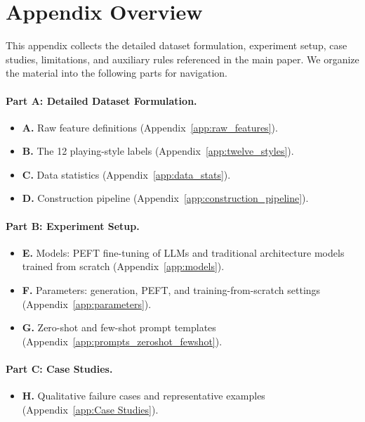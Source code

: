 
\section*{Appendix Overview}
\label{app:overview}

This appendix collects the detailed dataset formulation, experiment setup, case studies, limitations, and auxiliary rules referenced in the main paper. We organize the material into the following parts for navigation.

\paragraph{Part A: Detailed Dataset Formulation.}
\begin{itemize}
    \item \textbf{A.} Raw feature definitions (Appendix~\ref{app:raw_features}).
    \item \textbf{B.} The 12 playing-style labels (Appendix~\ref{app:twelve_styles}).
    \item \textbf{C.} Data statistics (Appendix~\ref{app:data_stats}).
    \item \textbf{D.} Construction pipeline (Appendix~\ref{app:construction_pipeline}).
\end{itemize}

\paragraph{Part B: Experiment Setup.}
\begin{itemize}
    \item \textbf{E.} Models: PEFT fine-tuning of LLMs and traditional architecture models trained from scratch (Appendix~\ref{app:models}).
    \item \textbf{F.} Parameters: generation, PEFT, and training-from-scratch settings (Appendix~\ref{app:parameters}).
    \item \textbf{G.} Zero-shot and few-shot prompt templates (Appendix~\ref{app:prompts_zeroshot_fewshot}).
\end{itemize}

\paragraph{Part C: Case Studies.}
\begin{itemize}
    \item \textbf{H.} Qualitative failure cases and representative examples (Appendix~\ref{app:Case Studies}).
\end{itemize}

